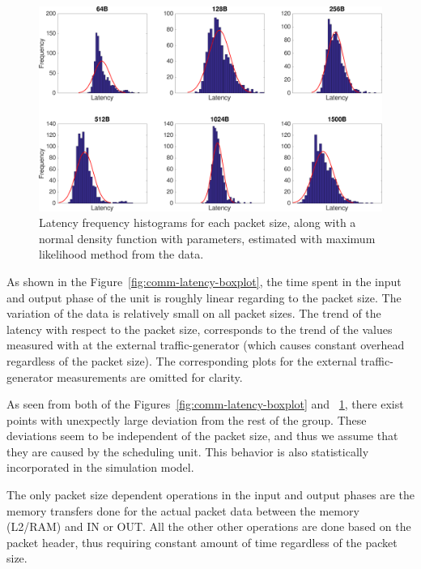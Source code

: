 \begin{figure}[]
  \begin{center}
    \includegraphics[width=\textwidth]{images/comm-latency-histograms.pdf}
    \caption{Latency frequency histograms for each packet size, along with a normal density function with parameters, estimated with maximum likelihood method from the data.}
    \label{fig:comm-latency-histograms}
  \end{center}
\end{figure}

As shown in the Figure~\ref{fig:comm-latency-boxplot}, the time spent in the input and output phase of the unit is roughly linear regarding to the packet size. The variation of the data is relatively small on all packet sizes. The trend of the latency with respect to the packet size, corresponds to the trend of the values measured with at the external traffic-generator (which causes constant overhead regardless of the packet size). The corresponding plots for the external traffic-generator measurements are omitted for clarity.

As seen from both of the Figures~\ref{fig:comm-latency-boxplot} and ~\ref{fig:comm-latency-histograms}, there exist points with unexpectly large deviation from the rest of the group. These deviations seem to be independent of the packet size, and thus we assume that they are caused by the scheduling unit. This behavior is also statistically incorporated in the simulation model.

The only packet size dependent operations in the input and output phases are the memory transfers done for the actual packet data between the memory (L2/RAM) and IN or OUT. All the other other operations are done based on the packet header, thus requiring constant amount of time regardless of the packet size.

